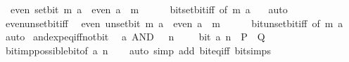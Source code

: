 \begin{isabellebody}
\ \ {\isacartoucheopen}even\ {\isacharparenleft}{\kern0pt}set{\isacharunderscore}{\kern0pt}bit\ m\ a{\isacharparenright}{\kern0pt}\ {\isasymlongleftrightarrow}\ even\ a\ {\isasymand}\ m\ {\isasymnoteq}\ {}{\isacartoucheclose}\isanewline
%
\isadelimproof
\ \ %
\endisadelimproof
%
\isatagproof
{}\isamarkupfalse%
\ bit{\isacharunderscore}{\kern0pt}set{\isacharunderscore}{\kern0pt}bit{\isacharunderscore}{\kern0pt}iff\ {\isacharbrackleft}{\kern0pt}of\ m\ a\ {}{\isacharbrackright}{\kern0pt}\ \isamarkupfalse%
\ auto%
\endisatagproof
{\isafoldproof}%
%
\isadelimproof
\isanewline
%
\endisadelimproof
\isanewline
{}\isamarkupfalse%
\ even{\isacharunderscore}{\kern0pt}unset{\isacharunderscore}{\kern0pt}bit{\isacharunderscore}{\kern0pt}iff{\isacharcolon}{\kern0pt}\isanewline
\ \ {\isacartoucheopen}even\ {\isacharparenleft}{\kern0pt}unset{\isacharunderscore}{\kern0pt}bit\ m\ a{\isacharparenright}{\kern0pt}\ {\isasymlongleftrightarrow}\ even\ a\ {\isasymor}\ m\ {\isacharequal}{\kern0pt}\ {}{\isacartoucheclose}\isanewline
%
\isadelimproof
\ \ %
\endisadelimproof
%
\isatagproof
{}\isamarkupfalse%
\ bit{\isacharunderscore}{\kern0pt}unset{\isacharunderscore}{\kern0pt}bit{\isacharunderscore}{\kern0pt}iff\ {\isacharbrackleft}{\kern0pt}of\ m\ a\ {}{\isacharbrackright}{\kern0pt}\ \isamarkupfalse%
\ auto%
\endisatagproof
{\isafoldproof}%
%
\isadelimproof
\isanewline
%
\endisadelimproof
\isanewline
{}\isamarkupfalse%
\ and{\isacharunderscore}{\kern0pt}exp{\isacharunderscore}{\kern0pt}eq{\isacharunderscore}{\kern0pt}{}{\isacharunderscore}{\kern0pt}iff{\isacharunderscore}{\kern0pt}not{\isacharunderscore}{\kern0pt}bit{\isacharcolon}{\kern0pt}\isanewline
\ \ {\isacartoucheopen}a\ AND\ {}\ {\isacharcircum}{\kern0pt}\ n\ {\isacharequal}{\kern0pt}\ {}\ {\isasymlongleftrightarrow}\ {\isasymnot}\ bit\ a\ n{\isacartoucheclose}\ {\isacharparenleft}{\kern0pt}\ {\isacartoucheopen}{\isacharquery}{\kern0pt}P\ {\isasymlongleftrightarrow}\ {\isacharquery}{\kern0pt}Q{\isacartoucheclose}{\isacharparenright}{\kern0pt}\isanewline
%
\isadelimproof
\ \ %
\endisadelimproof
%
\isatagproof
{}\isamarkupfalse%
\ bit{\isacharunderscore}{\kern0pt}imp{\isacharunderscore}{\kern0pt}possible{\isacharunderscore}{\kern0pt}bit{\isacharbrackleft}{\kern0pt}of\ a\ n{\isacharbrackright}{\kern0pt}\isanewline
\ \ \isamarkupfalse%
\ {\isacharparenleft}{\kern0pt}auto\ simp\ add{\isacharcolon}{\kern0pt}\ bit{\isacharunderscore}{\kern0pt}eq{\isacharunderscore}{\kern0pt}iff\ bit{\isacharunderscore}{\kern0pt}simps{\isacharparenright}{\kern0pt}%

\end{isabellebody}
